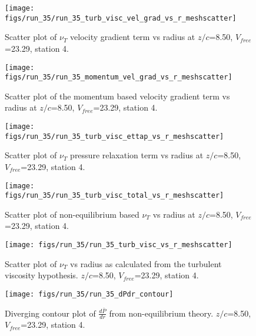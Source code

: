 \begin{figure}[H]
\centering
\texttt{[image: figs/run\_35/run\_35\_turb\_visc\_vel\_grad\_vs\_r\_meshscatter]}
\caption{Scatter plot of $\nu_T$ velocity gradient term vs radius at $z/c$=8.50, $V_{free}$=23.29, station 4.}
\end{figure}


\begin{figure}[H]
\centering
\texttt{[image: figs/run\_35/run\_35\_momentum\_vel\_grad\_vs\_r\_meshscatter]}
\caption{Scatter plot of the momentum based velocity gradient term vs radius at $z/c$=8.50, $V_{free}$=23.29, station 4.}
\end{figure}


\begin{figure}[H]
\centering
\texttt{[image: figs/run\_35/run\_35\_turb\_visc\_ettap\_vs\_r\_meshscatter]}
\caption{Scatter plot of $\nu_T$ pressure relaxation term vs radius at $z/c$=8.50, $V_{free}$=23.29, station 4.}
\end{figure}


\begin{figure}[H]
\centering
\texttt{[image: figs/run\_35/run\_35\_turb\_visc\_total\_vs\_r\_meshscatter]}
\caption{Scatter plot of non-equilibrium based $\nu_T$ vs radius at $z/c$=8.50, $V_{free}$=23.29, station 4.}
\end{figure}


\begin{figure}[H]
\centering
\texttt{[image: figs/run\_35/run\_35\_turb\_visc\_vs\_r\_meshscatter]}
\caption{Scatter plot of $\nu_T$ vs radius as calculated from the turbulent viscosity hypothesis. $z/c$=8.50, $V_{free}$=23.29, station 4.}
\end{figure}


\begin{figure}[H]
\centering
\texttt{[image: figs/run\_35/run\_35\_dPdr\_contour]}
\caption{Diverging contour plot of $\frac{d\bar{P}}{dr}$ from non-equilibrium theory. $z/c$=8.50, $V_{free}$=23.29, station 4.}
\end{figure}


